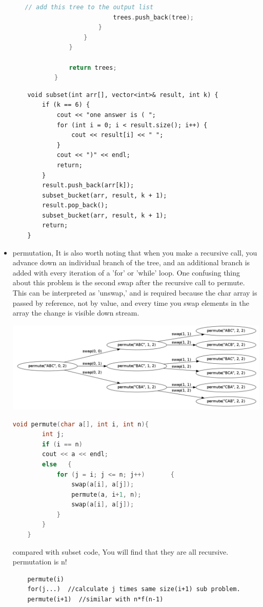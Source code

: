 \documentclass[a4paper,11pt,twoside]{book}
\begin{document}
\begin{itemize}
\begin{itemize}
\begin{lstlisting}[frame=single, language=c++]
						// add this tree to the output list
						trees.push_back(tree);
					}
				}
			}
			
			return trees;
		}
	\end{lstlisting}
	
	
	
	
\end{itemize}


\begin{lstlisting}
	void subset(int arr[], vector<int>& result, int k) {
		if (k == 6) {
			cout << "one answer is ( ";
			for (int i = 0; i < result.size(); i++) {
				cout << result[i] << " ";
			}
			cout << ")" << endl;
			return;
		}
		result.push_back(arr[k]);
		subset_bucket(arr, result, k + 1);
		result.pop_back();
		subset_bucket(arr, result, k + 1);
		return;
	}
\end{lstlisting}

	\item permutation, It is also worth noting that when you make a recursive call, you advance down an individual branch of the tree, and an additional branch is added with every iteration of a 'for' or 'while' loop. One confusing thing about this problem is the second swap after the recursive call to permute. This can be interpreted as 'unswap,' and is required because the char array is passed by reference, not by value, and every time you swap elements in the array the change is visible down stream.


\includegraphics[scale=0.25]{pics/permutation.png}


\begin{lstlisting}[frame=single, language=c++]
	void permute(char a[], int i, int n){
		int j;
		if (i == n)
		cout << a << endl;
		else   {
			for (j = i; j <= n; j++)       {
				swap(a[i], a[j]);          
				permute(a, i+1, n);
				swap(a[i], a[j]);
			}
		}
	} 	
\end{lstlisting}

compared with subset code, You will find that they are all recursive. permutation is n!
\begin{lstlisting}
	permute(i)
	for(j...)  //calculate j times same size(i+1) sub problem.
	permute(i+1)  //similar with n*f(n-1)
	
\end{lstlisting}


\end{itemize}
\end{document}
